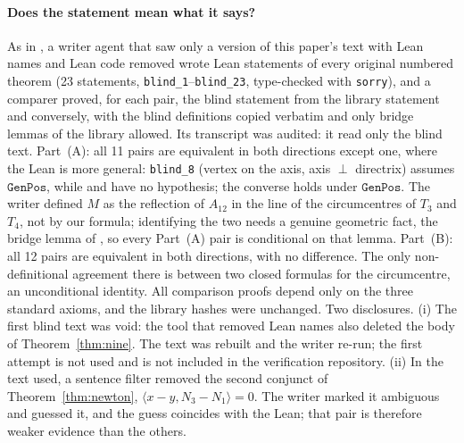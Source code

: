 \documentclass[11pt]{article}
\theoremstyle{definition}
\theoremstyle{remark}
\newcommand{\lean}[1]{\texttt{#1}}
\begin{document}
\paragraph{Does the statement mean what it says?} As in \cite{paperE}, a writer agent that saw only a
version of this paper's text with Lean names and Lean code removed wrote Lean statements of every
original numbered theorem (23 statements, \lean{blind\_1}--\lean{blind\_23}, type-checked with \lean{sorry}), and a
comparer proved, for each pair, the blind statement from the library statement and conversely, with the
blind definitions copied verbatim and only bridge lemmas of the library allowed. Its transcript was
audited: it read only the blind text. Part~(A): all 11 pairs are equivalent in both directions except
one, where the Lean is more general: \lean{blind\_8} (vertex on the axis, axis $\perp$ directrix)
assumes $\lean{GenPos}$, while  and  have no
hypothesis; the converse holds under $\lean{GenPos}$. The writer defined $M$ as the reflection of
$A_{12}$ in the line of the circumcentres of $T_3$ and $T_4$, not by our formula; identifying the two
needs a genuine geometric fact, the bridge lemma  of \cite{paperE}, so
every Part~(A) pair is conditional on that lemma. Part~(B): all 12 pairs are equivalent in both
directions, with no difference. The only non-definitional agreement there is between two closed formulas
for the circumcentre, an unconditional identity. All comparison proofs depend only on the three
standard axioms, and the library hashes were unchanged.
Two disclosures. (i) The first blind text was void: the tool that removed Lean names also deleted the
body of Theorem~\ref{thm:nine}. The text was rebuilt and the writer re-run; the first attempt is
not used and is not included in the verification repository. (ii) In the text used, a sentence filter removed the second conjunct of
Theorem~\ref{thm:newton}, $\langle x-y,N_3-N_1\rangle=0$. The writer marked it ambiguous and guessed it,
and the guess coincides with the Lean; that pair is therefore weaker evidence than the others.
\end{document}

